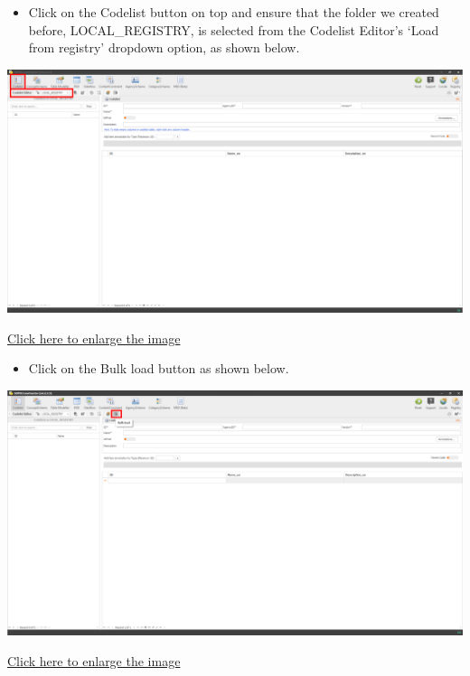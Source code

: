 \documentclass[
]{book}
\providecommand{\tightlist}{%
  \setlength{\itemsep}{0pt}\setlength{\parskip}{0pt}}
\begin{document}
\begin{itemize}
\tightlist
\item
  Click on the Codelist button on top and ensure that the folder we created before, LOCAL\_REGISTRY, is selected from the Codelist Editor's `Load from registry' dropdown option, as shown below.
\end{itemize}

\begin{center}\includegraphics[width=1\linewidth]{./images/image082} \end{center}

\href{images/image082.png}{Click here to enlarge the image}

\begin{itemize}
\tightlist
\item
  Click on the Bulk load button as shown below.
\end{itemize}

\begin{center}\includegraphics[width=1\linewidth]{./images/image084} \end{center}

\href{images/image084.png}{Click here to enlarge the image}
\end{document}
